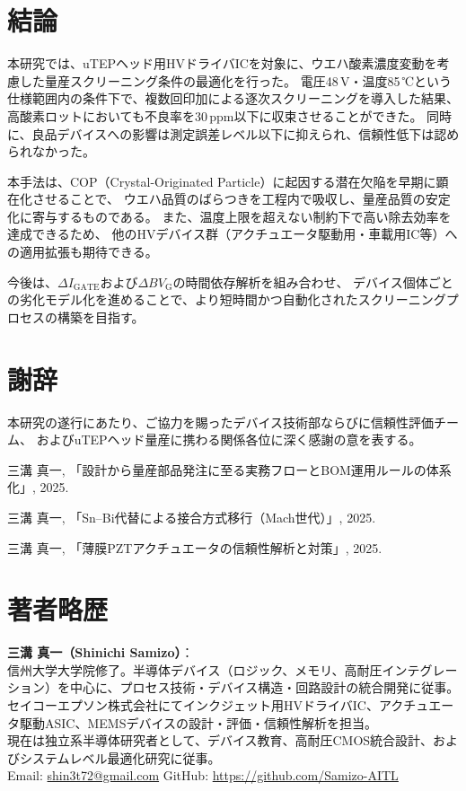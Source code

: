 \documentclass[twocolumn]{ieeetran}
\begin{document}
\section{結論}
本研究では、uTEPヘッド用HVドライバICを対象に、ウエハ酸素濃度変動を考慮した量産スクリーニング条件の最適化を行った。
電圧48\,V・温度85\,℃という仕様範囲内の条件下で、複数回印加による逐次スクリーニングを導入した結果、
高酸素ロットにおいても不良率を30\,ppm以下に収束させることができた。
同時に、良品デバイスへの影響は測定誤差レベル以下に抑えられ、信頼性低下は認められなかった。

本手法は、COP（Crystal-Originated Particle）に起因する潜在欠陥を早期に顕在化させることで、
ウエハ品質のばらつきを工程内で吸収し、量産品質の安定化に寄与するものである。
また、温度上限を超えない制約下で高い除去効率を達成できるため、
他のHVデバイス群（アクチュエータ駆動用・車載用IC等）への適用拡張も期待できる。

今後は、$\Delta I_\mathrm{GATE}$および$\Delta BV_\mathrm{G}$の時間依存解析を組み合わせ、
デバイス個体ごとの劣化モデル化を進めることで、より短時間かつ自動化されたスクリーニングプロセスの構築を目指す。

\section*{謝辞}
本研究の遂行にあたり、ご協力を賜ったデバイス技術部ならびに信頼性評価チーム、
およびuTEPヘッド量産に携わる関係各位に深く感謝の意を表する。

\begin{thebibliography}{99}

三溝 真一, 「設計から量産部品発注に至る実務フローとBOM運用ルールの体系化」, 2025.

三溝 真一, 「Sn–Bi代替による接合方式移行（Mach世代）」, 2025.

三溝 真一, 「薄膜PZTアクチュエータの信頼性解析と対策」, 2025.

\end{thebibliography}

\section*{著者略歴}
\noindent\textbf{三溝 真一（Shinichi Samizo）}：\\
信州大学大学院修了。半導体デバイス（ロジック、メモリ、高耐圧インテグレーション）を中心に、プロセス技術・デバイス構造・回路設計の統合開発に従事。\\
セイコーエプソン株式会社にてインクジェット用HVドライバIC、アクチュエータ駆動ASIC、MEMSデバイスの設計・評価・信頼性解析を担当。\\
現在は独立系半導体研究者として、デバイス教育、高耐圧CMOS統合設計、およびシステムレベル最適化研究に従事。\\
Email: \href{mailto:shin3t72@gmail.com}{shin3t72@gmail.com}\quad
GitHub: \url{https://github.com/Samizo-AITL}
\end{document}
